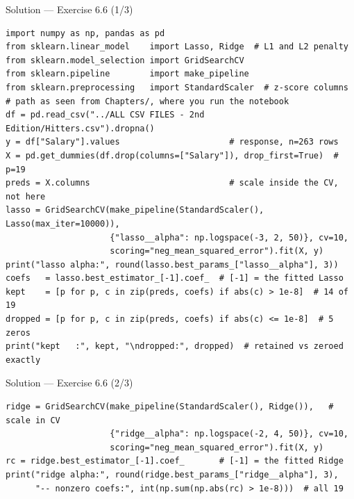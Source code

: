 \documentclass[aspectratio=169,11pt]{beamer}
\begin{document}
\begin{frame}[fragile]{Solution --- Exercise 6.6 (1/3)}
  \begin{lstlisting}
import numpy as np, pandas as pd
from sklearn.linear_model    import Lasso, Ridge  # L1 and L2 penalty
from sklearn.model_selection import GridSearchCV
from sklearn.pipeline        import make_pipeline
from sklearn.preprocessing   import StandardScaler  # z-score columns
# path as seen from Chapters/, where you run the notebook
df = pd.read_csv("../ALL CSV FILES - 2nd Edition/Hitters.csv").dropna()
y = df["Salary"].values                      # response, n=263 rows
X = pd.get_dummies(df.drop(columns=["Salary"]), drop_first=True)  # p=19
preds = X.columns                            # scale inside the CV, not here
lasso = GridSearchCV(make_pipeline(StandardScaler(), Lasso(max_iter=10000)),
                     {"lasso__alpha": np.logspace(-3, 2, 50)}, cv=10,
                     scoring="neg_mean_squared_error").fit(X, y)
print("lasso alpha:", round(lasso.best_params_["lasso__alpha"], 3))
coefs   = lasso.best_estimator_[-1].coef_  # [-1] = the fitted Lasso
kept    = [p for p, c in zip(preds, coefs) if abs(c) > 1e-8]  # 14 of 19
dropped = [p for p, c in zip(preds, coefs) if abs(c) <= 1e-8]  # 5 zeros
print("kept   :", kept, "\ndropped:", dropped)  # retained vs zeroed exactly
  \end{lstlisting}
\end{frame}

\begin{frame}[fragile]{Solution --- Exercise 6.6 (2/3)}
  \begin{lstlisting}
ridge = GridSearchCV(make_pipeline(StandardScaler(), Ridge()),   # scale in CV
                     {"ridge__alpha": np.logspace(-2, 4, 50)}, cv=10,
                     scoring="neg_mean_squared_error").fit(X, y)
rc = ridge.best_estimator_[-1].coef_       # [-1] = the fitted Ridge
print("ridge alpha:", round(ridge.best_params_["ridge__alpha"], 3),
      "-- nonzero coefs:", int(np.sum(np.abs(rc) > 1e-8)))  # all 19
  \end{lstlisting}
\end{frame}
\end{document}
